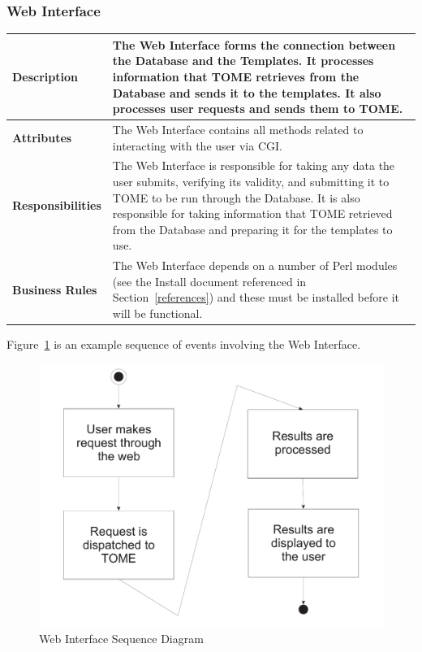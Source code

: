\documentclass[12pt,titlepage]{article}
\begin{document}
\subsubsection{Web Interface}
\begin{longtable}{|p{}|p{}|}
	\hline
	\textbf{Description} & The Web Interface forms the connection between the Database and the Templates.  It processes information that TOME retrieves from the Database and sends it to the templates.  It also processes user requests and sends them to TOME.\\
	\hline
	\textbf{Attributes} & The Web Interface contains all methods related to interacting with the user via CGI.\\
	\hline
	\textbf{Responsibilities} & The Web Interface is responsible for taking any data the user submits, verifying its validity, and submitting it to TOME to be run through the Database.  It is also responsible for taking information that TOME retrieved from the Database and preparing it for the templates to use.\\
	\hline
	\textbf{Business Rules} & The Web Interface depends on a number of Perl modules (see the Install document referenced in Section~\ref{references}) and these must be installed before it will be functional.\\
	\hline
\end{longtable}
\newpage
Figure~\ref{WebInterfaceSequenceDiagram} is an example sequence of events involving the Web Interface.
\begin{figure}[h]
	\centering
	\includegraphics[width=.5\textwidth]{WebInterfaceSequenceDiagram}
	\caption{Web Interface Sequence Diagram}
	\label{WebInterfaceSequenceDiagram}
\end{figure}
\end{document}
